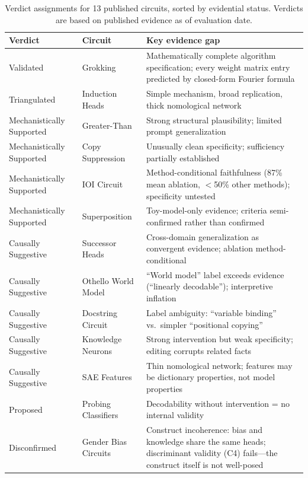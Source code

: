 \documentclass[10pt]{article}
\begin{document}
\begin{table}[H]
\centering
\small
\caption{Verdict assignments for 13 published circuits, sorted by evidential status. Verdicts are based on published evidence as of evaluation date.}
\label{tab:case-studies}
\renewcommand{\arraystretch}{1.2}
\begin{tabular}{@{}l>{\raggedright\arraybackslash}p{3cm}>{\raggedright\arraybackslash}p{7cm}@{}}
\toprule
\textbf{Verdict} & \textbf{Circuit} & \textbf{Key evidence gap} \\
\midrule
Validated & Grokking & Mathematically complete algorithm specification; every weight matrix entry predicted by closed-form Fourier formula \\
\midrule
Triangulated & Induction Heads & Simple mechanism, broad replication, thick nomological network \\
\midrule
Mechanistically Supported & Greater-Than & Strong structural plausibility; limited prompt generalization \\
\midrule
Mechanistically Supported & Copy Suppression & Unusually clean specificity; sufficiency partially established \\
\midrule
Mechanistically Supported & IOI Circuit & Method-conditional faithfulness (87\% mean ablation, $<$50\% other methods); specificity untested \\
\midrule
Mechanistically Supported & Superposition & Toy-model-only evidence; criteria semi-confirmed rather than confirmed \\
\midrule
Causally Suggestive & Successor Heads & Cross-domain generalization as convergent evidence; ablation method-conditional \\
\midrule
Causally Suggestive & Othello World Model & ``World model'' label exceeds evidence (``linearly decodable''); interpretive inflation \\
\midrule
Causally Suggestive & Docstring Circuit & Label ambiguity: ``variable binding'' vs.\ simpler ``positional copying'' \\
\midrule
Causally Suggestive & Knowledge Neurons & Strong intervention but weak specificity; editing corrupts related facts \\
\midrule
Causally Suggestive & SAE Features & Thin nomological network; features may be dictionary properties, not model properties \\
\midrule
Proposed & Probing Classifiers & Decodability without intervention = no internal validity \\
\midrule
Disconfirmed & Gender Bias Circuits & Construct incoherence: bias and knowledge share the same heads; discriminant validity (C4) fails---the construct itself is not well-posed \\
\bottomrule
\end{tabular}
\end{table}
\end{document}
